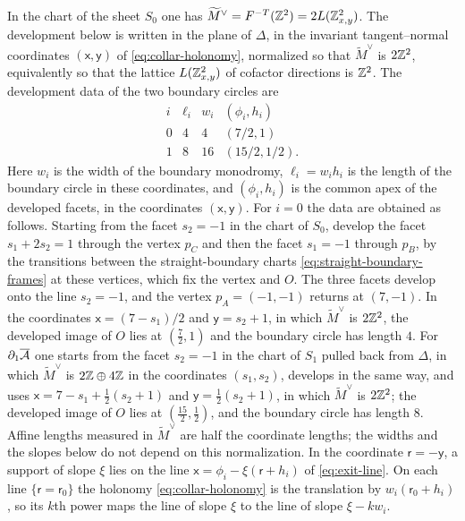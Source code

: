 In the chart of the sheet $S_0$ one has
$\widetilde M^\vee=F^{-T}(\mathbb Z^2)=2L(\mathbb Z^2_{x,y})$.  The development below
is written in the plane of $\Delta$, in the invariant tangent--normal
coordinates $(\mathsf x,\mathsf y)$ of \eqref{eq:collar-holonomy},
normalized so that $\widetilde M^\vee$ is $2\mathbb Z^2$, equivalently so that the
lattice $L(\mathbb Z^2_{x,y})$ of cofactor directions is $\mathbb Z^2$.  The development
data of the two boundary circles are
\begin{equation}\label{eq:development-data}
\begin{array}{c|c|c|c}
 i&\ell_i&w_i&(\phi_i,h_i)\\ \hline
 0&4&4&(7/2,1)\\
 1&8&16&(15/2,1/2).
\end{array}
\end{equation}
Here $w_i$ is the width of the boundary monodromy, $\ell_i=w_ih_i$ is the
length of the boundary circle in these coordinates, and $(\phi_i,h_i)$ is
the common apex of the developed facets, in the coordinates
$(\mathsf x,\mathsf y)$.  For $i=0$ the data are obtained as follows.
Starting from the facet $s_2=-1$ in the chart of $S_0$, develop the facet
$s_1+2s_2=1$ through the vertex $p_C$ and then the facet $s_1=-1$ through
$p_B$, by the transitions between the straight-boundary charts
\eqref{eq:straight-boundary-frames} at these vertices, which fix the vertex
and $O$.  The three facets develop onto the line $s_2=-1$, and the vertex
$p_A=(-1,-1)$ returns at $(7,-1)$.  In the coordinates
$\mathsf x=(7-s_1)/2$ and $\mathsf y=s_2+1$, in which $\widetilde M^\vee$ is
$2\mathbb Z^2$, the developed image of $O$ lies at $(\frac72,1)$ and the
boundary circle has length $4$.  For $\partial_1\overline{\mathcal A}$ one starts
from the facet $s_2=-1$ in the chart of $S_1$ pulled back from $\Delta$, in
which $\widetilde M^\vee$ is $2\mathbb Z\oplus4\mathbb Z$ in the coordinates $(s_1,s_2)$,
develops in the same way, and uses
$\mathsf x=7-s_1+\frac12(s_2+1)$ and $\mathsf y=\frac12(s_2+1)$, in which
$\widetilde M^\vee$ is $2\mathbb Z^2$; the developed image of $O$ lies at
$(\frac{15}2,\frac12)$, and the boundary circle has length $8$.  Affine
lengths measured in $\widetilde M^\vee$
are half the coordinate lengths; the widths and the slopes below do not
depend on this normalization.  In the coordinate $\mathsf r=-\mathsf y$, a
support of slope $\xi$ lies on the line
$\mathsf x=\phi_i-\xi(\mathsf r+h_i)$ of \eqref{eq:exit-line}.  On each line
$\{\mathsf r=\mathsf r_0\}$ the holonomy \eqref{eq:collar-holonomy} is the
translation by $w_i(\mathsf r_0+h_i)$, so its $k$th power maps the line of
slope $\xi$ to the line of slope $\xi-kw_i$.

